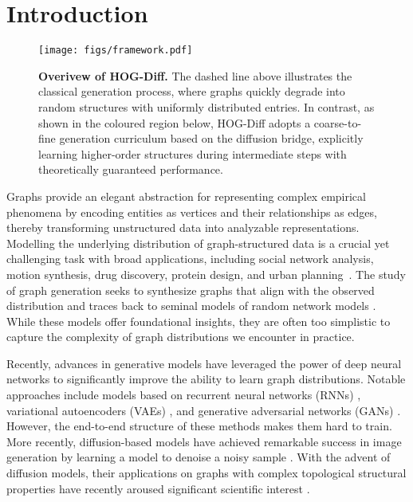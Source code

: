 \section{Introduction}

\begin{figure}
\centering
\texttt{[image: figs/framework.pdf]}
\caption{\textbf{Overivew of HOG-Diff.} The dashed line above illustrates the classical generation process, where graphs quickly degrade into random structures with uniformly distributed entries. In contrast, as shown in the coloured region below, HOG-Diff adopts a coarse-to-fine generation curriculum based on the diffusion bridge, explicitly learning higher-order structures during intermediate steps with theoretically guaranteed performance.}
\label{fig:framework}
\vspace{-4mm}
\end{figure}


Graphs provide an elegant abstraction for representing complex empirical phenomena by encoding entities as vertices and their relationships as edges, thereby transforming unstructured data into analyzable representations.
%
Modelling the underlying distribution of graph-structured data is a crucial yet challenging task with broad applications, including social network analysis, motion synthesis, drug discovery, protein design, and urban planning~\cite{zhu2022survey}.
%
The study of graph generation seeks to synthesize graphs that align with the observed distribution and traces back to seminal models of random network models \cite{ER1960, BA1999}.
While these models offer foundational insights, they are often too simplistic to capture the complexity of graph distributions we encounter in practice.


Recently, advances in generative models have leveraged the power of deep neural networks to significantly improve the ability to learn graph distributions.
Notable approaches include models based on recurrent neural networks (RNNs) \cite{GraphRNN2018},  variational autoencoders (VAEs) \cite{VAE-Jin2018}, and generative adversarial networks (GANs) \cite{GAN1-MolGAN, GAN2-Spectre}.
However, the end-to-end structure of these methods makes them hard to train.
%
More recently, diffusion-based models have achieved remarkable success in image generation by learning a model to denoise a noisy sample \cite{DDPM+NeurIPS2020, Score-SDE+ICLR2021}. 
%
With the advent of diffusion models, their applications on graphs with complex topological structural properties have recently aroused significant scientific interest \cite{EDPGNN-2020,GDSS+ICML2022,DiGress+ICLR2023}.





